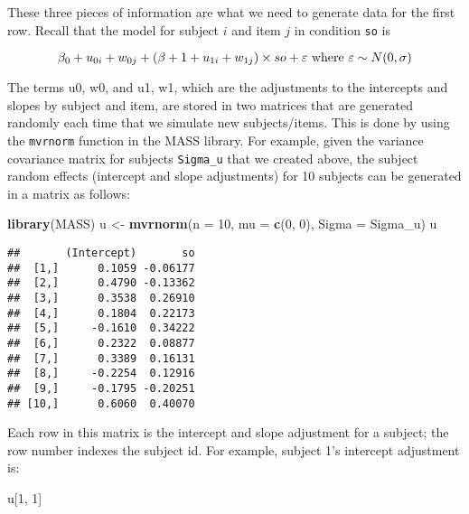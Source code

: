 \documentclass[12pt,]{krantz}
\newenvironment{Shaded}{\begin{snugshade}}{\end{snugshade}}
\newcommand{\DataTypeTok}[1]{\textcolor[rgb]{0.13,0.29,0.53}{#1}}
\newcommand{\DecValTok}[1]{\textcolor[rgb]{0.00,0.00,0.81}{#1}}
\newcommand{\KeywordTok}[1]{\textcolor[rgb]{0.13,0.29,0.53}{\textbf{#1}}}
\newcommand{\NormalTok}[1]{#1}
\newcommand{\StringTok}[1]{\textcolor[rgb]{0.31,0.60,0.02}{#1}}
\begin{document}
These three pieces of information are what we need to generate data for the first row. Recall that the model for subject \(i\) and item \(j\) in condition \texttt{so} is

\begin{equation}
\beta_0 + u_{0i} + w_{0j} + (\beta+1 + u_{1i} + w_{1j})\times so + \varepsilon \hbox{ where } \varepsilon \sim N(0,\sigma)
\end{equation}

The terms u0, w0, and u1, w1, which are the adjustments to the intercepts and slopes by subject and item, are stored in two matrices that are generated randomly each time that we simulate new subjects/items. This is done by using the \texttt{mvrnorm} function in the MASS library. For example, given the variance covariance matrix for subjects \texttt{Sigma\_u} that we created above, the subject random effects (intercept and slope adjustments) for 10 subjects can be generated in a matrix as follows:

\begin{Shaded}
\begin{Highlighting}[]
\KeywordTok{library}\NormalTok{(MASS)}
\NormalTok{u <-}\StringTok{ }\KeywordTok{mvrnorm}\NormalTok{(}\DataTypeTok{n =} \DecValTok{10}\NormalTok{, }\DataTypeTok{mu =} \KeywordTok{c}\NormalTok{(}\DecValTok{0}\NormalTok{, }\DecValTok{0}\NormalTok{), }\DataTypeTok{Sigma =}\NormalTok{ Sigma_u)}
\NormalTok{u}
\end{Highlighting}
\end{Shaded}

\begin{verbatim}
##       (Intercept)       so
##  [1,]      0.1059 -0.06177
##  [2,]      0.4790 -0.13362
##  [3,]      0.3538  0.26910
##  [4,]      0.1804  0.22173
##  [5,]     -0.1610  0.34222
##  [6,]      0.2322  0.08877
##  [7,]      0.3389  0.16131
##  [8,]     -0.2254  0.12916
##  [9,]     -0.1795 -0.20251
## [10,]      0.6060  0.40070
\end{verbatim}

Each row in this matrix is the intercept and slope adjustment for a subject; the row number indexes the subject id. For example, subject 1's intercept adjustment is:

\begin{Shaded}
\begin{Highlighting}[]
\NormalTok{u[}\DecValTok{1}\NormalTok{, }\DecValTok{1}\NormalTok{]}
\end{Highlighting}
\end{Shaded}
\end{document}
